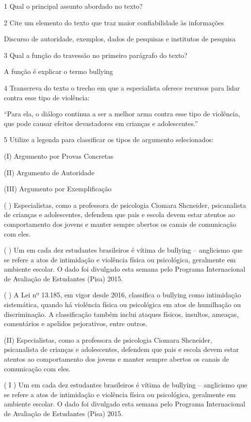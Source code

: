 {{\begin{escolha}
\num{1} Qual o principal assunto abordado no texto?


\num{2} Cite um elemento do texto que traz maior confiabilidade às informações

Discurso de autoridade, exemplos, dados de pesquisas e institutos de
pesquisa

\num{3} Qual a função do travessão no primeiro parágrafo do texto?

A função é explicar o termo bullying

\num{4} Transcreva do texto o trecho em que a especialista oferece recursos para lidar contra esse tipo de violência:

``Para ela, o diálogo continua a ser a melhor arma contra esse tipo de
violência, que pode causar efeitos devastadores em crianças e
adolescentes.''

\num{5} Utilize a legenda para classificar os tipos de argumento selecionados:

(I) Argumento por Provas Concretas

(II) Argumento de Autoridade

(III) Argumento por Exemplificação

( ) Especialistas, como a professora de psicologia Ciomara Shcneider,
psicanalista de crianças e adolescentes, defendem que pais e escola
devem estar atentos ao comportamento dos jovens e manter sempre abertos
os canais de comunicação com eles.

( ) Um em cada dez estudantes brasileiros é vítima de bullying --
anglicismo que se refere a atos de intimidação e violência física ou
psicológica, geralmente em ambiente escolar. O dado foi divulgado esta
semana pelo Programa Internacional de Avaliação de Estudantes (Pisa)
2015.

( ) A Lei nº 13.185, em vigor desde 2016, classifica o bullying como
intimidação sistemática, quando há violência física ou psicológica em
atos de humilhação ou discriminação. A classificação também inclui
ataques físicos, insultos, ameaças, comentários e apelidos pejorativos,
entre outros.

(II) Especialistas, como a professora de psicologia Ciomara Shcneider,
psicanalista de crianças e adolescentes, defendem que pais e escola
devem estar atentos ao comportamento dos jovens e manter sempre abertos
os canais de comunicação com eles.

( I ) Um em cada dez estudantes brasileiros é vítima de bullying --
anglicismo que se refere a atos de intimidação e violência física ou
psicológica, geralmente em ambiente escolar. O dado foi divulgado esta
semana pelo Programa Internacional de Avaliação de Estudantes (Pisa)
2015.


\end{escolha}}}
